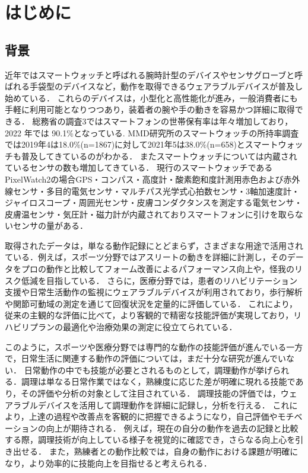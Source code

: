\chapter{はじめに}
\section{背景}
近年ではスマートウォッチと呼ばれる腕時計型のデバイスやセンサグローブと呼ばれる手袋型のデバイスなど，動作を取得できるウェアラブルデバイスが普及し始めている．
これらのデバイスは，小型化と高性能化が進み，一般消費者にも手軽に利用可能となりつつあり，装着者の腕や手の動きを容易かつ詳細に取得できる．
総務省の調査3ではスマートフォンの世帯保有率は年々増加しており，2022 年では 90.1\%となっている.
MMD研究所のスマートウォッチの所持率調査では2019年4は18.0\%(n=1867)に対して2021年5は38.0\%(n=658)とスマートウォッチも普及してきているのがわかる．
またスマートウォッチについては内蔵されているセンサの数も増加してきている．
現行のスマートウォッチであるPixelWatch2の場合GPS・コンパス・高度計・酸素飽和度計測用赤色および赤外線センサ・多目的電気センサ・マルチパス光学式心拍数センサ・3軸加速度計・ジャイロスコープ・周囲光センサ・皮膚コンダクタンスを測定する電気センサ・皮膚温センサ・気圧計・磁力計が内蔵されておりスマートフォンに引けを取らないセンサの量がある．

取得されたデータは，単なる動作記録にとどまらず，さまざまな用途で活用されている．例えば，スポーツ分野ではアスリートの動きを詳細に計測し，そのデータをプロの動作と比較してフォーム改善によるパフォーマンス向上や，怪我のリスク低減を目指している．
さらに，医療分野では，患者のリハビリテーション支援や日常生活動作の監視にウェアラブルデバイスが利用されており，歩行解析や関節可動域の測定を通じて回復状況を定量的に評価している．
これにより，従来の主観的な評価に比べて，より客観的で精密な技能評価が実現しており，リハビリプランの最適化や治療効果の測定に役立てられている．

このように，スポーツや医療分野では専門的な動作の技能評価が進んでいる一方で，日常生活に関連する動作の評価については，まだ十分な研究が進んでいない．
日常動作の中でも技能が必要とされるものとして，調理動作が挙げられる．調理は単なる日常作業ではなく，熟練度に応じた差が明確に現れる技能であり，その評価や分析の対象として注目されている．
調理技能の評価では，ウェアラブルデバイスを活用して調理動作を詳細に記録し，分析を行える．
これにより，上達の過程や改善点を客観的に把握できるようになり，自己評価やモチベーションの向上が期待される．
例えば，現在の自分の動作を過去の記録と比較する際，調理技術が向上している様子を視覚的に確認でき，さらなる向上心を引き出せる．
また，熟練者との動作比較では，自身の動作における課題が明確になり，より効率的に技能向上を目指せると考えられる．

